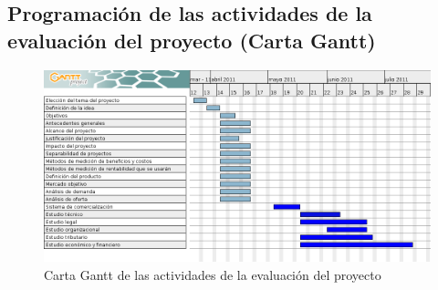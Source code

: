 %		
%
%
%

\subsection{Programación de las actividades de la evaluación del proyecto (Carta Gantt)}

\begin{figure}[h]
\centering
\includegraphics[scale=0.4]{img/carta_gantt.png}
\caption[Carta Gantt de las actividades de la evaluación del proyecto]{Carta Gantt de las actividades de la evaluación del proyecto}
\end{figure}
%
%

